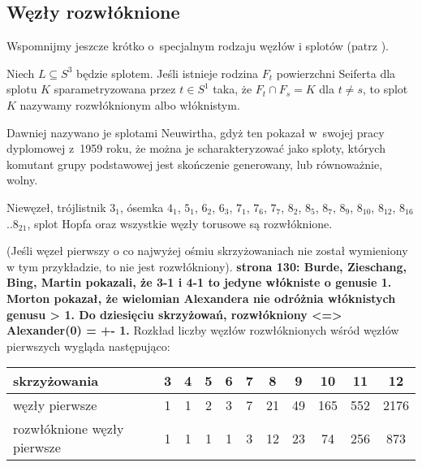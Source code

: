 
\subsection{Węzły rozwłóknione}
%
%
Wspomnijmy jeszcze krótko o~specjalnym rodzaju węzłów i splotów (patrz \cite[s. 49-50]{kawauchi1996}).

\begin{definition}
    Niech $L \subseteq S^3$ będzie splotem.
    Jeśli istnieje rodzina $F_t$ powierzchni Seiferta dla splotu $K$ sparametryzowana przez $t \in S^1$ taka, że $F_t \cap F_s = K$ dla $t \neq s$, to splot $K$ nazywamy rozwłóknionym albo włóknistym.
\end{definition}

%
Dawniej nazywano je splotami Neuwirtha, gdyż ten pokazał w~swojej pracy dyplomowej z~1959 roku, że można je scharakteryzować jako sploty, których komutant grupy podstawowej jest skończenie generowany, lub równoważnie, wolny.

\begin{example}
    Niewęzeł, trójlistnik $3_1$, ósemka $4_1$, $5_{1}$, $6_{2}$, $6_{3}$, $7_{1}$, $7_{6}$, $7_{7}$, $8_{2}$, $8_{5}$, $8_{7}$, $8_{9}$, $8_{10}$, $8_{12}$, $8_{16}$..$8_{21}$, splot Hopfa oraz wszystkie węzły torusowe są rozwłóknione.
\end{example}

(Jeśli węzeł pierwszy o co najwyżej ośmiu skrzyżowaniach nie został wymieniony w tym przykładzie, to nie jest rozwłókniony).
{\color{red} \textbf{\cite{burde2014} strona 130: Burde, Zieschang, Bing, Martin pokazali, że 3-1 i 4-1 to jedyne włókniste o genusie 1. Morton pokazał, że wielomian Alexandera nie odróżnia włóknistych genusu > 1. Do dziesięciu skrzyżowań, rozwłókniony <=> Alexander(0) = +- 1.}}
Rozkład liczby węzłów rozwłóknionych wśród węzłów pierwszych wygląda następująco:

\renewcommand*{\arraystretch}{1.4}
\footnotesize
\begin{longtable}{lcccccccccc}
    \hline
    \textbf{skrzyżowania} & 3 & 4 & 5 & 6 & 7 & 8 & 9 & 10 &  11 &  12 \\ \hline \endhead
    węzły pierwsze & 1 & 1 & 2 & 3 & 7 & 21 & 49 & 165 & 552 & 2176 \\
    rozwłóknione węzły pierwsze & 1 & 1 & 1 & 1 & 3 & 12 & 23 & 74 & 256 & 873 \\
    \hline
\end{longtable}
\normalsize

